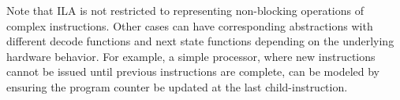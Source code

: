 \documentclass[letterpaper, 11 pt]{article}  %
\begin{document}
Note that ILA is not restricted to representing non-blocking operations of 
complex instructions. 
Other cases can have corresponding abstractions with different decode 
functions and next state functions depending on the underlying hardware behavior.
For example, a simple processor, where new instructions cannot be issued until
previous instructions are complete, can be modeled by ensuring the program
counter be updated at the last child-instruction.



\end{document}
